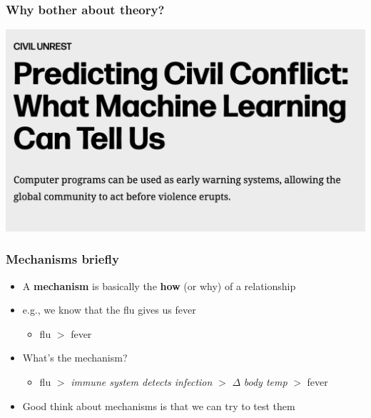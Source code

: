 \documentclass[aspectratio=43]{beamer}
\begin{document}
\begin{frame}
\frametitle{Why bother about theory?}
\centering

\includegraphics[width = \textwidth]{../img/predicting_conflict}

\end{frame}

\begin{frame}
\frametitle{Mechanisms briefly}
\centering

\begin{itemize}
  \item A \textbf{mechanism} is basically the \textbf{how} (or why) of a relationship
  \item e.g., we know that the flu gives us fever
  \begin{itemize}
    \item flu $>$ fever
  \end{itemize}
  \item<2-> What's the mechanism?
  \begin{itemize}
    \item flu $>$ \textit{immune system detects infection} $>$ $\Delta$ \textit{body temp} $>$ fever
  \end{itemize}
  \item<3-> Good think about mechanisms is that we can try to test them
\end{itemize}

\end{frame}
\end{document}
